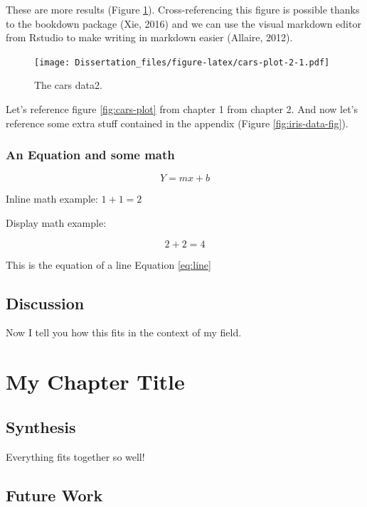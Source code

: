 \documentclass[
  10pt,
]{report}
\begin{document}
These are more results (Figure \ref{fig:cars-plot-2}). Cross-referencing this figure is possible thanks to the bookdown package (Xie, 2016) and we can use the visual markdown editor from Rstudio to make writing in markdown easier (Allaire, 2012).

\begin{figure}
\centering
\texttt{[image: Dissertation\_files/figure-latex/cars-plot-2-1.pdf]}
\caption{\label{fig:cars-plot-2}The cars data2.}
\end{figure}

Let's reference figure \ref{fig:cars-plot} from chapter 1 from chapter 2. And now let's reference some extra stuff contained in the appendix (Figure \ref{fig:iris-data-fig}).

\hypertarget{an-equation-and-some-math}{%
\subsection{An Equation and some math}\label{an-equation-and-some-math}}

\begin{equation}
  Y=mx+b 
  \label{eq:line}
\end{equation}

Inline math example: \(1+1=2\)

Display math example:

\[
2+2=4
\]

This is the equation of a line Equation \eqref{eq:line}

\hypertarget{discussion-1}{%
\section{Discussion}\label{discussion-1}}

Now I tell you how this fits in the context of my field.

\hypertarget{my-chapter-title-1}{%
\chapter{My Chapter Title}\label{my-chapter-title-1}}

\hypertarget{synthesis}{%
\section{Synthesis}\label{synthesis}}

Everything fits together so well!

\hypertarget{future-work}{%
\section{Future Work}\label{future-work}}
\end{document}
